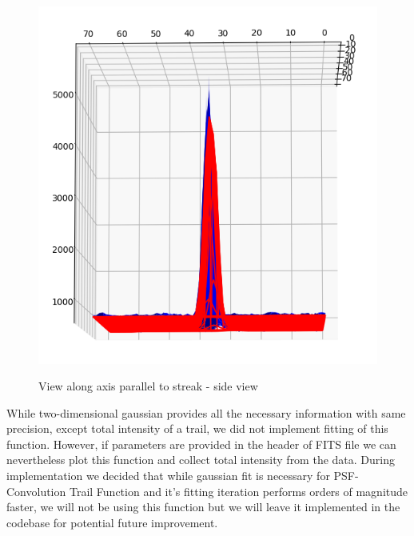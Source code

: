 \documentclass[12pt, a4paper, oneside]{book}
\begin{document}
\begin{figure}[H]
    \begin{center}
        \includegraphics[scale=2.00]{images/veres_side.png}
        \label{img:veres_side}
        \caption{View along axis parallel to streak - side view}
    \end{center}
\end{figure}

While two-dimensional gaussian provides all the necessary information with same precision, except total intensity of a trail, we did not implement fitting of this function.
However, if parameters are provided in the header of FITS file we can nevertheless plot this function and collect total intensity from the data.
During implementation we decided that while gaussian fit is necessary for PSF-Convolution Trail Function and it's fitting iteration performs orders of magnitude faster, we will not be using this function but we will leave it implemented in the codebase for potential future improvement.
\end{document}
